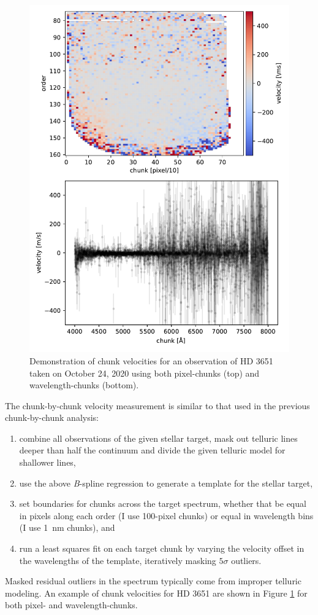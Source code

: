 \begin{figure}
    \centering
    \includegraphics{figures-5/chunk-vels.pdf}
    \caption[HD 3651 forward model chunk velocities]{Demonstration of chunk velocities for an observation of HD 3651 taken on October 24, 2020 using both pixel-chunks (top) and wavelength-chunks (bottom).}
    \label{fig:chunk-vels}
\end{figure}

The chunk-by-chunk velocity measurement is similar to that used in the previous chunk-by-chunk analysis:
\begin{enumerate}
    \item combine all observations of the given stellar target, mask out telluric lines deeper than half the continuum and divide the given telluric model for shallower lines,
    \item use the above \textit{B}-spline regression to generate a template for the stellar target,
    \item set boundaries for chunks across the target spectrum, whether that be equal in pixels along each order (I use 100-pixel chunks) or equal in wavelength bins (I use 1~nm chunks), and
    \item run a least squares fit on each target chunk by varying the velocity offset in the wavelengths of the template, iteratively masking $5\sigma$ outliers.
\end{enumerate}
Masked residual outliers in the spectrum typically come from improper telluric modeling. An example of chunk velocities for HD 3651 are shown in Figure \ref{fig:chunk-vels} for both pixel- and wavelength-chunks.

